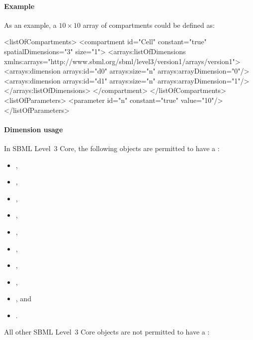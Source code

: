 \paragraph{Example}

As an example, a $10 \times 10$ array of compartments  could be defined as:

\begin{example}
<listOfCompartments>
    <compartment id="Cell" constant="true" spatialDimensions="3" size="1">
        <arrays:listOfDimensions
            xmlns:arrays="http://www.sbml.org/sbml/level3/version1/arrays/version1">
            <arrays:dimension arrays:id="d0" arrays:size="n" arrays:arrayDimension="0"/>
            <arrays:dimension arrays:id="d1" arrays:size="n" arrays:arrayDimension="1"/>
        </arrays:listOfDimensions>
    </compartment>
</listOfCompartments>
<listOfParameters>
    <parameter id="n" constant="true" value="10"/>
</listOfParameters>
\end{example}

\paragraph{Dimension usage}
\label{sec:dimensionUsage}

In SBML Level~3 Core, the following objects are permitted to have a \ListOfDimensions:

\nolinenumbers
\begin{multicols}{3}
\begin{itemize}\setlength{\parskip}{-0.2ex}
\item \Compartment,
\item \Constraint,
\item \Event,
\item \EventAssignment,
\item \InitialAssignment,
\item \Parameter,
\item \Reaction,
\item \Rule,
\item \Species, and
\item \SpeciesReference.
\end{itemize}
\end{multicols}
\linenumbers

All other SBML Level~3 Core objects are not permitted to have a \ListOfDimensions:


